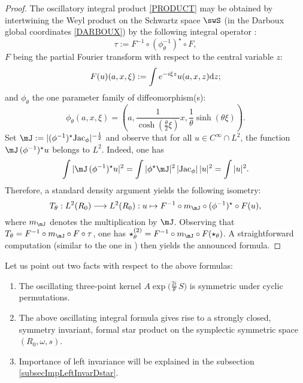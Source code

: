 \begin{proof}
The oscillatory integral product \eqref{PRODUCT} may be obtained by intertwining the Weyl product on the Schwartz space $\swS$ (in the Darboux global coordinates \eqref{DARBOUX}) by the following integral operator \cite{Biel-Massar}:
\begin{equation*}
\tau:=F ^{-1}\circ(\phi_\theta^{-1})^\star\circ F,
\end{equation*}
$F $ being the partial Fourier transform with respect to        the central variable $z$:
\begin{equation*}
F (u)(a,x,\xi):=\int e^{-i\xi z}u(a,x,z){\rm d}z;
\end{equation*}
and $\phi_\theta$ the one parameter family of diffeomorphism(s):
\begin{equation*}
\phi_\theta(a,x,\xi)=(a,\frac{1}{\cosh(\frac{\theta}{2}\xi)}x,
\frac{1}{\theta}\sinh(\theta\xi)).
\end{equation*}
Set $\mJ:=|(\phi^{-1})^\star\mbox{Jac}_\phi|^{-\frac{1}{2}}$ and observe that for all $u\in C^\infty\cap L^2$, the function $\mJ\,(\phi^{-1})^\star u$ belongs to $L^2$.  Indeed, one has
\begin{equation*}
\int|\mJ\,(\phi^{-1})^\star u|^2=\int|\phi^\star \mJ|^2\,|\mbox{Jac}_\phi|\,|u|^2=\int|u|^2.
\end{equation*}
Therefore, a standard density argument yields the following isometry:
\begin{equation*}
T_\theta:L^2(R_0)\longrightarrow L^2(R_0):
u\mapsto F ^{-1}\circ m_\mJ\circ(\phi^{-1})^\star\circ F (u),
\end{equation*}
where  $m_{\mJ}$ denotes the multiplication by $\mJ$.  Observing that $T_\theta=F ^{-1}\circ m_{\mJ}\circ F \circ\tau$, one has $\star^{(2)}_\theta=F ^{-1}\circ m_{\mJ}\circ F (\star_\theta)$.  A straightforward computation (similar to the one in \cite{StrictSolvableSym})     then yields the announced formula.
\end{proof}

Let us point out two facts with respect to the above formulas:
\begin{enumerate}
\item The oscillating three-point kernel $A\exp \big (\frac{2i}{\theta}\,S\big)$ is symmetric under cyclic permutations.
\item The above oscillating integral formula gives rise to a strongly closed, symmetry invariant, formal star product on the symplectic symmetric space $(R_0,\omega,s)$.
\item
	Importance of left invariance will be explained in the subsection \ref{subsecImpLeftInvarDstar}.
\end{enumerate}

